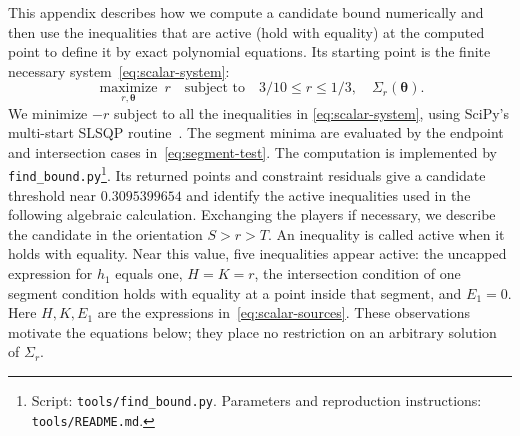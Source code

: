 \documentclass[11pt]{article}
\theoremstyle{remark}
\theoremstyle{plain}
\begin{document}
This appendix describes how we compute a candidate bound numerically
and then use the inequalities that are active (hold with equality)
at the computed point to define it by exact polynomial
equations. Its starting point is the finite
necessary system~\eqref{eq:scalar-system}:
\begin{equation}
 \operatorname*{maximize}_{r,\boldsymbol\theta}\ r
 \quad\text{subject to}\quad 3/10\le r\le1/3,\quad
                              \Sigma_r(\boldsymbol\theta).
 \label{eq:app-bound-search}
\end{equation}
We minimize $-r$ subject to all the inequalities in
\eqref{eq:scalar-system}, using SciPy's multi-start SLSQP
routine~\cite{scipy2020,kraft1988}. The segment minima are evaluated
by the endpoint and intersection cases in~\eqref{eq:segment-test}.
The computation is implemented by \nolinkurl{find_bound.py}\footnote{Script:
\nolinkurl{tools/find_bound.py}. Parameters and reproduction instructions:
\nolinkurl{tools/README.md}.}.
Its returned points and constraint residuals give a candidate
threshold near $0.3095399654$ and identify the active inequalities
used in the following algebraic calculation. Exchanging the players
if necessary, we describe the candidate in the orientation $S>r>T$.
An inequality is called active when it holds with
equality. Near this value, five inequalities appear active: the
uncapped expression for $h_1$ equals one, $H=K=r$, the intersection
condition of one segment condition holds with equality at a point
inside that segment, and $E_1=0$. Here $H,K,E_1$
are the expressions in~\eqref{eq:scalar-sources}. These observations
motivate the equations below; they place no restriction on an
arbitrary solution of $\Sigma_r$.
\end{document}
